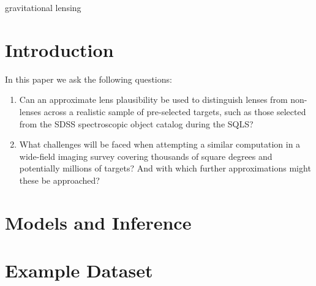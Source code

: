 \documentclass[useAMS,usenatbib]{mn2e}
\begin{document}

\begin{keywords}
  gravitational lensing
\end{keywords}

\setcounter{footnote}{1}


\section{Introduction}
\label{sec:intro}

In this paper we ask the following questions:

\begin{enumerate}

\item Can an approximate lens plausibility be used to distinguish lenses from
non-lenses across a realistic sample of pre-selected targets, such as those
selected from the SDSS spectroscopic object catalog during the SQLS?

\item What challenges will be faced when attempting a similar computation in a
wide-field imaging survey covering thousands of square degrees and potentially
millions of targets? And with which further approximations might these be
approached?

\end{enumerate}




\section{Models and Inference}
\label{sec:model}



\section{Example Dataset}
\label{sec:data:example}
\end{document}
